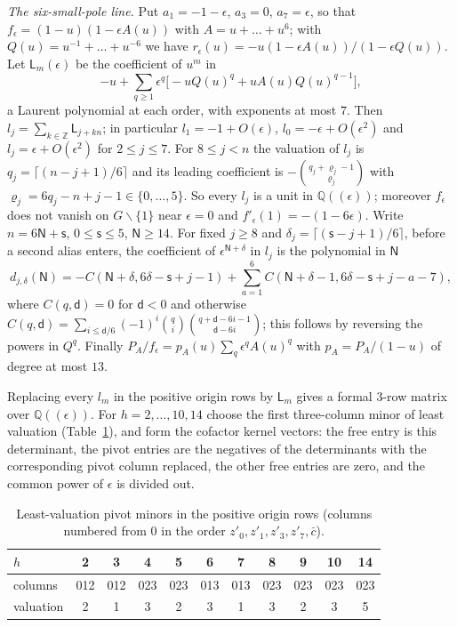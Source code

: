 \documentclass{amsart}
\theoremstyle{definition}
\theoremstyle{remark}
\numberwithin{equation}{section}
\newcommand{\ZZ}{\mathbb{Z}}
\newcommand{\QQ}{\mathbb{Q}}
\begin{document}
\emph{The six-small-pole line.} Put $a_1=-1-\epsilon$, $a_3=0$, $a_7=\epsilon$, so that
$f_\epsilon=(1-u)(1-\epsilon A(u))$ with $A=u+\dots+u^6$; with
$Q(u)=u^{-1}+\dots+u^{-6}$ we have $r_\epsilon(u)=-u(1-\epsilon A(u))/(1-\epsilon Q(u))$.
Let $\mathsf L_m(\epsilon)$ be the coefficient of $u^m$ in
\[
  -u+\sum_{q\ge1}\epsilon^q\bigl[-uQ(u)^q+uA(u)Q(u)^{q-1}\bigr],
\]
a Laurent polynomial at each order, with exponents at most $7$. Then
$l_j=\sum_{k\in\ZZ}\mathsf L_{j+kn}$; in particular $l_1=-1+O(\epsilon)$,
$l_0=-\epsilon+O(\epsilon^2)$ and $l_j=\epsilon+O(\epsilon^2)$ for $2\le j\le7$. For
$8\le j<n$ the valuation of $l_j$ is $q_j=\lceil(n-j+1)/6\rceil$ and its leading
coefficient is $-\binom{q_j+\varrho_j-1}{\varrho_j}$ with
$\varrho_j=6q_j-n+j-1\in\{0,\dots,5\}$. So every $l_j$ is a unit in
$\QQ((\epsilon))$; moreover $f_\epsilon$ does not vanish on $G\smallsetminus\{1\}$ near
$\epsilon=0$ and $f'_\epsilon(1)=-(1-6\epsilon)$. Write $n=6\mathsf N+\mathsf s$,
$0\le\mathsf s\le5$, $\mathsf N\ge14$. For fixed $j\ge8$ and
$\delta_j=\lceil(\mathsf s-j+1)/6\rceil$, before a second alias enters, the coefficient
of $\epsilon^{\mathsf N+\delta}$ in $l_j$ is the polynomial in $\mathsf N$
\[
  d_{j,\delta}(\mathsf N)=-C(\mathsf N+\delta,6\delta-\mathsf s+j-1)
  +\sum_{a=1}^6C(\mathsf N+\delta-1,6\delta-\mathsf s+j-a-7),
\]
where $C(q,\mathsf d)=0$ for $\mathsf d<0$ and otherwise
$C(q,\mathsf d)=\sum_{i\le\mathsf d/6}(-1)^i\binom qi\binom{q+\mathsf d-6i-1}{\mathsf d-6i}$;
this follows by reversing the powers in $Q^q$. Finally
$P_A/f_\epsilon=p_A(u)\sum_q\epsilon^qA(u)^q$ with $p_A=P_A/(1-u)$ of degree at most
$13$.

Replacing every $l_m$ in the positive origin rows by $\mathsf L_m$ gives a formal
$3$-row matrix over $\QQ((\epsilon))$. For $h=2,\dots,10,14$ choose the first
three-column minor of least valuation (Table~\ref{tab:cofactor}), and form the
cofactor kernel vectors: the free entry is this determinant, the pivot entries are the
negatives of the determinants with the corresponding pivot column replaced, the other
free entries are zero, and the common power of $\epsilon$ is divided out.

\begin{table}[H]
\caption{Least-valuation pivot minors in the positive origin rows (columns
numbered from $0$ in the order $z'_0,z'_1,z'_3,z'_7,\bar c$).}\label{tab:cofactor}
\begin{tabular}{lcccccccccc}
\toprule
$h$&2&3&4&5&6&7&8&9&10&14\\
\midrule
columns&012&012&023&023&013&013&023&023&023&023\\
valuation&2&1&3&2&3&1&3&2&3&5\\
\bottomrule
\end{tabular}
\end{table}
\end{document}
